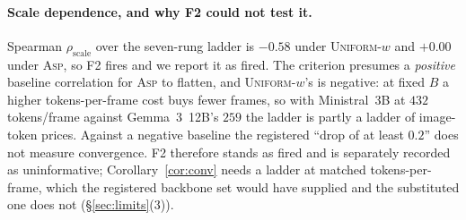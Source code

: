\documentclass[10pt]{article}
\providecommand{\VrhoUnif}{--}
\providecommand{\VrhoAsp}{--}
\renewcommand{\VrhoUnif}{-0.58}
\renewcommand{\VrhoAsp}{+0.00}
\theoremstyle{definition}
\theoremstyle{plain}
\newcommand{\ASP}{\textsc{Asp}}
\begin{document}
\paragraph{Scale dependence, and why F2 could not test it.} Spearman
$\rho_{\mathrm{scale}}$ over the seven-rung ladder is $\VrhoUnif{}$ under \textsc{Uniform-}$w$
and $\VrhoAsp{}$ under \ASP{}, so F2 fires and we report it as fired. The criterion presumes a
\emph{positive} baseline correlation for \ASP{} to flatten, and \textsc{Uniform-}$w$'s is
negative: at fixed $B$ a higher tokens-per-frame cost buys fewer frames, so with Ministral~3B
at $432$ tokens/frame against Gemma~3~12B's $259$ the ladder is partly a ladder of image-token
prices. Against a negative baseline the registered ``drop of at least $0.2$'' does not measure
convergence. F2 therefore stands as fired and is separately recorded as uninformative;
Corollary~\ref{cor:conv} needs a ladder at matched tokens-per-frame, which the registered
backbone set would have supplied and the substituted one does not (\S\ref{sec:limits}(3)).

\label{sec:analysis}
\end{document}
